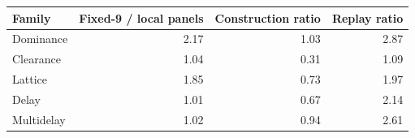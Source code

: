 \begin{tabular}{lrrr}\toprule
Family & Fixed-9 / local panels & Construction ratio & Replay ratio\\\midrule
Dominance & 2.17 & 1.03 & 2.87\\
Clearance & 1.04 & 0.31 & 1.09\\
Lattice & 1.85 & 0.73 & 1.97\\
Delay & 1.01 & 0.67 & 2.14\\
Multidelay & 1.02 & 0.94 & 2.61\\
\bottomrule\end{tabular}